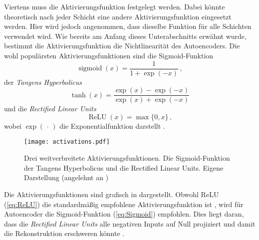 Viertens muss die Aktivierungsfunktion festgelegt werden. Dabei könnte theoretisch nach jeder
Schicht eine andere Aktivierungsfunktion eingesetzt werden. Hier wird jedoch angenommen, dass
dieselbe Funktion für alle Schichten verwendet wird. Wie bereits am Anfang dieses Unterabschnitts
erwähnt wurde, bestimmt die Aktivierungsfunktion die Nichtlinearität des Autoencoders. Die wohl
populärsten Aktivierungsfunktionen sind die Sigmoid-Funktion
\begin{equation}
	\label{eq:Sigmoid}
	\operatorname{sigmoid}(x) = \frac{1}{1 + \exp (-x)} \, ,
\end{equation}
der \textit{Tangens Hyperbolicus}
\begin{equation}
	\label{eq:tanh}
	\operatorname{tanh}(x) = \frac{\exp(x) - \exp(-x)}{\exp(x) + \exp(-x)}
\end{equation}
und die \textit{Rectified Linear Units}
\begin{equation}
	\label{eq:ReLU}
	\operatorname{ReLU}(x) = \max\{0, x\} \, ,
\end{equation}
wobei $\exp(\, \cdot \,)$ die Exponentialfunktion darstellt \parencites[191 -- 195]{Goodfellow.2016}[4]{Charte.2018}.
\begin{figure}[h]
	\centering
	\texttt{[image: activations.pdf]}
	\caption[Drei weitverbreitete Aktivierungsfunktionen.]{Drei weitverbreitete Aktivierungsfunktionen. \captiona Die Sigmoid-Funktion \captionb der Tangens Hyperbolicus und \captionc die Rectified Linear Units. Eigene Darstellung (angelehnt an \textcite[4]{Charte.2018})}
	\label{fig:activations}
\end{figure}
Die Aktivierungsfunktionen sind grafisch in  dargestellt.
Obwohl ReLU (\eqref{eq:ReLU}) die standardmäßig empfohlene Aktivierungsfunktion ist \parencite[195]{Goodfellow.2016}, wird für Autoencoder die Sigmoid-Funktion (\eqref{eq:Sigmoid})
empfohlen. Dies liegt daran, dass die \textit{Rectified Linear Units} alle negativen Inputs auf
Null projiziert und damit die Rekonstruktion erschweren könnte \parencite[4]{Charte.2018}.

